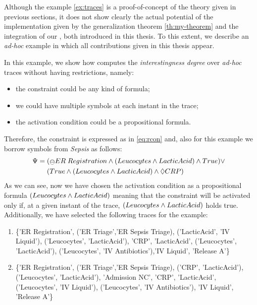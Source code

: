 Although the example \ref{ex:traces} is a proof-of-concept of the theory given in previous sections, it does not show clearly the actual potential of the \janus implementation given by the generalization theorem \ref{th:my-theorem} and the integration of our \LTLfToDFA, both introduced in this thesis. To this extent, we describe an \textit{ad-hoc} example in which all contributions given in this thesis appear.

\begin{example}\label{ex:adhoc-result}
In this example, we show how \janus computes the \textit{interestingness degree} over \textit{ad-hoc} traces without having restrictions, namely:

\begin{itemize}
\item the constraint could be any kind of formula;
\item we could have multiple symbols at each instant in the trace;
\item the activation condition could be a propositional formula.
\end{itemize}

\noindent Therefore, the constraint is expressed as in \ref{eq:rcon} and, also for this example we borrow symbols from \textit{Sepsis} as follows:
\begin{align*}
\Psi = \;& (\Yesterday ER\; Registration \lAND (Leucocytes \lAND LacticAcid) \lAND True) \lOR\\
& (True \lAND (Leucocytes \lAND LacticAcid) \lAND \Diamond CRP)
\end{align*}
As we can see, now we have chosen the activation condition as a propositional formula $(Leucocytes \wedge LacticAcid)$ meaning that the constraint will be activated only if, at a given instant of the trace, $(Leucocytes \wedge LacticAcid)$ holds true.
Additionally, we have selected the following traces for the example:
\begin{enumerate}
\item \label{list:adhoc-trace1} \{'ER Registration', ('ER Triage','ER Sepsis Triage), ('LacticAcid', 'IV Liquid'),  ('Leucocytes', 'LacticAcid'), 'CRP', 'LacticAcid', ('Leucocytes', 'LacticAcid'), ('Leucocytes', 'IV Antibiotics'),'IV Liquid', 'Release A'\}
\item \label{list:adhoc-trace2} \{'ER Registration', ('ER Triage','ER Sepsis Triage), ('CRP', 'LacticAcid'),  ('Leucocytes', 'LacticAcid'), 'Admission NC', 'CRP', 'LacticAcid', ('Leucocytes', 'IV Liquid'), ('Leucocytes', 'IV Antibiotics'), 'IV Liquid', 'Release A'\}
\end{enumerate}


\end{example}
